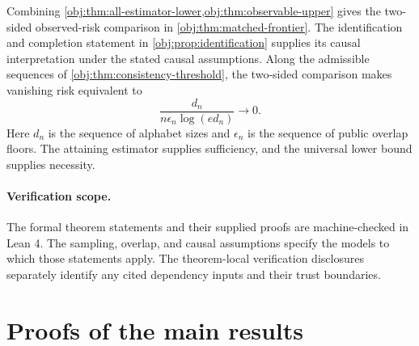 \documentclass[11pt]{article}
\begin{document}
Combining \cref{obj:thm:all-estimator-lower,obj:thm:observable-upper} gives the two-sided observed-risk comparison in \cref{obj:thm:matched-frontier}. The identification and completion statement in \cref{obj:prop:identification} supplies its causal interpretation under the stated causal assumptions. Along the admissible sequences of \cref{obj:thm:consistency-threshold}, the two-sided comparison makes vanishing risk equivalent to
\[
\frac{d_n}{n\epsilon_n\log(ed_n)}\longrightarrow0.
\]
Here \(d_n\) is the sequence of alphabet sizes and \(\epsilon_n\) is the sequence of public overlap floors. The attaining estimator supplies sufficiency, and the universal lower bound supplies necessity.

\paragraph{Verification scope.}
The formal theorem statements and their supplied proofs are machine-checked in Lean 4. The sampling, overlap, and causal assumptions specify the models to which those statements apply. The theorem-local verification disclosures separately identify any cited dependency inputs and their trust boundaries.


\section{Proofs of the main results}\label{sec:deferred-proofs}
\end{document}
